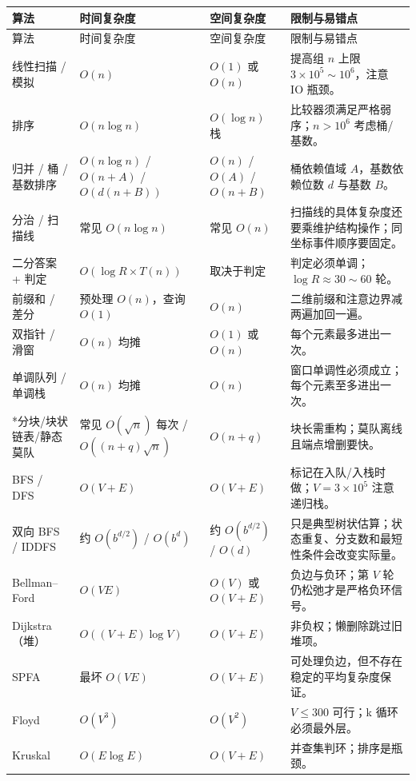 \documentclass[a4paper,11pt]{article}
\renewcommand{\arraystretch}{1.12}
\begin{document}
\begingroup
\small
\renewcommand{\arraystretch}{1.0}
\begin{longtable}{L{3cm} L{2.8cm} L{2.4cm} L{8cm}}
\toprule
算法 & 时间复杂度 & 空间复杂度 & 限制与易错点 \\
\midrule
\endfirsthead
\toprule
算法 & 时间复杂度 & 空间复杂度 & 限制与易错点 \\
\midrule
\endhead
\endfoot
\bottomrule
\endlastfoot

线性扫描 / 模拟 & $O(n)$ & $O(1)$ 或 $O(n)$ & 提高组 $n$ 上限 $3\times10^5\sim10^6$，注意 IO 瓶颈。\\[2mm]
排序 & $O(n\log n)$ & $O(\log n)$ 栈 & 比较器须满足严格弱序；$n>10^6$ 考虑桶/基数。\\[2mm]
归并 / 桶 / 基数排序 & $O(n\log n)$ / $O(n+A)$ / $O(d(n+B))$ & $O(n)$ / $O(A)$ / $O(n+B)$ & 桶依赖值域 $A$，基数依赖位数 $d$ 与基数 $B$。\\[2mm]
分治 / 扫描线 & 常见 $O(n\log n)$ & 常见 $O(n)$ & 扫描线的具体复杂度还要乘维护结构操作；同坐标事件顺序要固定。\\[2mm]
二分答案 + 判定 & $O(\log R\times T(n))$ & 取决于判定 & 判定必须单调；$\log R\approx30\sim60$ 轮。\\[2mm]
前缀和 / 差分 & 预处理 $O(n)$，查询 $O(1)$ & $O(n)$ & 二维前缀和注意边界减两遍加回一遍。\\[2mm]
双指针 / 滑窗 & $O(n)$ 均摊 & $O(1)$ 或 $O(n)$ & 每个元素最多进出一次。\\[2mm]
单调队列 / 单调栈 & $O(n)$ 均摊 & $O(n)$ & 窗口单调性必须成立；每个元素至多进出一次。\\[2mm]
*分块/块状链表/静态莫队 & 常见 $O(\sqrt n)$ 每次 / $O((n+q)\sqrt n)$ & $O(n+q)$ & 块长需重构；莫队离线且端点增删要快。\\[2mm]
BFS / DFS & $O(V+E)$ & $O(V+E)$ & 标记在入队/入栈时做；$V=3\times10^5$ 注意递归栈。\\[2mm]
双向 BFS / IDDFS & 约 $O(b^{d/2})$ / $O(b^d)$ & 约 $O(b^{d/2})$ / $O(d)$ & 只是典型树状估算；状态重复、分支数和最短性条件会改变实际量。\\[2mm]
Bellman--Ford & $O(VE)$ & $O(V)$ 或 $O(V+E)$ & 负边与负环；第 $V$ 轮仍松弛才是严格负环信号。\\[2mm]
Dijkstra（堆） & $O((V+E)\log V)$ & $O(V+E)$ & 非负权；懒删除跳过旧堆项。\\[2mm]
SPFA & 最坏 $O(VE)$ & $O(V+E)$ & 可处理负边，但不存在稳定的平均复杂度保证。\\[2mm]
Floyd & $O(V^3)$ & $O(V^2)$ & $V\le300$ 可行；k 循环必须最外层。\\[2mm]
Kruskal & $O(E\log E)$ & $O(V+E)$ & 并查集判环；排序是瓶颈。\\[2mm]

\end{longtable}
\end{document}
